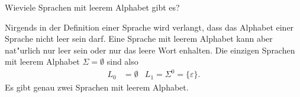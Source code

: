 Wieviele Sprachen mit leerem Alphabet gibt es?

\begin{loesung}
Nirgends in der Definition einer Sprache wird verlangt, dass das
Alphabet einer Sprache nicht leer sein darf. Eine Sprache mit leerem
Alphabet kann aber nat"urlich nur leer sein oder nur das leere Wort
enhalten. Die einzigen Sprachen mit leerem Alphabet $\Sigma=\emptyset$
sind also
\begin{align*}
L_0&=\emptyset& L_1=\Sigma^0=\{\varepsilon\}.
\end{align*}
Es gibt genau zwei Sprachen mit leerem Alphabet.
\end{loesung}
